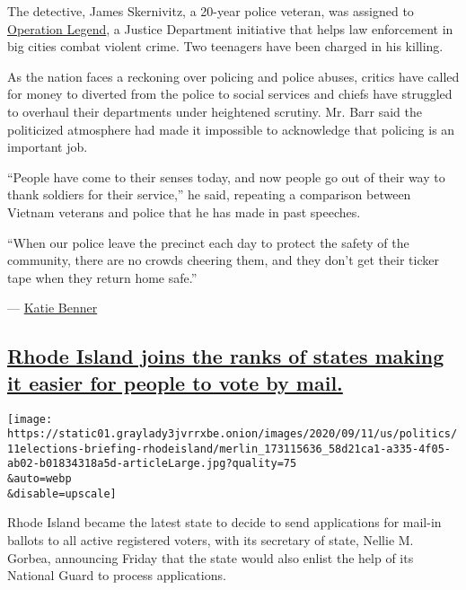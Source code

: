 The detective, James Skernivitz, a 20-year police veteran, was assigned
to
\href{https://www.justice.gov/opa/pr/attorney-general-william-p-barr-announces-launch-operation-legend?utm_medium=email\&utm_source=govdelivery}{Operation
Legend}, a Justice Department initiative that helps law enforcement in
big cities combat violent crime. Two teenagers have been charged in his
killing.

As the nation faces a reckoning over policing and police abuses, critics
have called for money to diverted from the police to social services and
chiefs have struggled to overhaul their departments under heightened
scrutiny. Mr. Barr said the politicized atmosphere had made it
impossible to acknowledge that policing is an important job.

``People have come to their senses today, and now people go out of their
way to thank soldiers for their service,'' he said, repeating a
comparison between Vietnam veterans and police that he has made in past
speeches.

``When our police leave the precinct each day to protect the safety of
the community, there are no crowds cheering them, and they don't get
their ticker tape when they return home safe.''

--- \href{https://www.nytimes3xbfgragh.onion/by/katie-benner}{Katie
Benner}

\hypertarget{rhode-island-joins-the-ranks-of-states-making-it-easier-for-people-to-vote-by-mail}{%
\subsection{\texorpdfstring{\protect\hyperlink{rhode-island-joins-the-ranks-of-states-making-it-easier-for-people-to-vote-by-mail}{Rhode
Island joins the ranks of states making it easier for people to vote by
mail.}}{Rhode Island joins the ranks of states making it easier for people to vote by mail.}}\label{rhode-island-joins-the-ranks-of-states-making-it-easier-for-people-to-vote-by-mail}}

\texttt{[image: https://static01.graylady3jvrrxbe.onion/images/2020/09/11/us/politics/11elections-briefing-rhodeisland/merlin\_173115636\_58d21ca1-a335-4f05-ab02-b01834318a5d-articleLarge.jpg?quality=75\\\&auto=webp\\\&disable=upscale]}

Rhode Island became the latest state to decide to send applications for
mail-in ballots to all active registered voters, with its secretary of
state, Nellie M. Gorbea, announcing Friday that the state would also
enlist the help of its National Guard to process applications.

